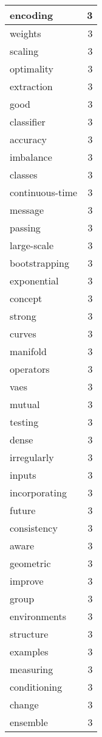 \begin{table}[h]
\begin{tabular}{|l|r|}
\hline
encoding & 3 \\
\hline
weights & 3 \\
\hline
scaling & 3 \\
\hline
optimality & 3 \\
\hline
extraction & 3 \\
\hline
good & 3 \\
\hline
classifier & 3 \\
\hline
accuracy & 3 \\
\hline
imbalance & 3 \\
\hline
classes & 3 \\
\hline
continuous-time & 3 \\
\hline
message & 3 \\
\hline
passing & 3 \\
\hline
large-scale & 3 \\
\hline
bootstrapping & 3 \\
\hline
exponential & 3 \\
\hline
concept & 3 \\
\hline
strong & 3 \\
\hline
curves & 3 \\
\hline
manifold & 3 \\
\hline
operators & 3 \\
\hline
vaes & 3 \\
\hline
mutual & 3 \\
\hline
testing & 3 \\
\hline
dense & 3 \\
\hline
irregularly & 3 \\
\hline
inputs & 3 \\
\hline
incorporating & 3 \\
\hline
future & 3 \\
\hline
consistency & 3 \\
\hline
aware & 3 \\
\hline
geometric & 3 \\
\hline
improve & 3 \\
\hline
group & 3 \\
\hline
environments & 3 \\
\hline
structure & 3 \\
\hline
examples & 3 \\
\hline
measuring & 3 \\
\hline
conditioning & 3 \\
\hline
change & 3 \\
\hline
ensemble & 3 \\
\hline

\end{tabular}
\end{table}
